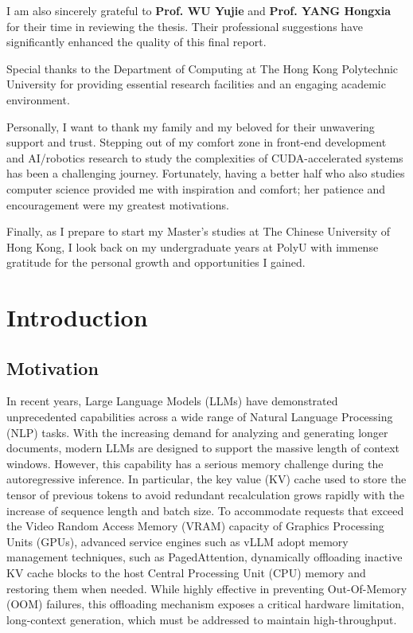 \documentclass{polyu-comp}
\begin{document}
I am also sincerely grateful to \textbf{Prof. WU Yujie} and \textbf{Prof. YANG Hongxia} for their time in reviewing the thesis. Their professional suggestions have significantly enhanced the quality of this final report.

Special thanks to the Department of Computing at The Hong Kong Polytechnic University for providing essential research facilities and an engaging academic environment.

Personally, I want to thank my family and my beloved for their unwavering support and trust. Stepping out of my comfort zone in front-end development and AI/robotics research to study the complexities of CUDA-accelerated systems has been a challenging journey. Fortunately, having a better half who also studies computer science provided me with inspiration and comfort; her patience and encouragement were my greatest motivations.

Finally, as I prepare to start my Master's studies at The Chinese University of Hong Kong, I look back on my undergraduate years at PolyU with immense gratitude for the personal growth and opportunities I gained.


\tableofcontents

\clearpage
{}
\listoftables

\clearpage
{}
\listoffigures


\section{Introduction}

\subsection{Motivation}
In recent years, Large Language Models (LLMs) have demonstrated unprecedented capabilities \cite{10.1145/3744746} across a wide range of Natural Language Processing (NLP) tasks. With the increasing demand for analyzing and generating longer documents, modern LLMs are designed to support the massive length of context windows. However, this capability has a serious memory challenge during the autoregressive inference. In particular, the key value (KV) cache used to store the tensor of previous tokens to avoid redundant recalculation grows rapidly with the increase of sequence length and batch size. To accommodate requests that exceed the Video Random Access Memory (VRAM) capacity of Graphics Processing Units (GPUs), advanced service engines such as vLLM \cite{kwon2023efficient} adopt memory management techniques, such as PagedAttention, dynamically offloading inactive KV cache blocks to the host Central Processing Unit (CPU) memory and restoring them when needed. While highly effective in preventing Out-Of-Memory (OOM) failures, this offloading mechanism exposes a critical hardware limitation, long-context generation, which must be addressed to maintain high-throughput.
\end{document}
